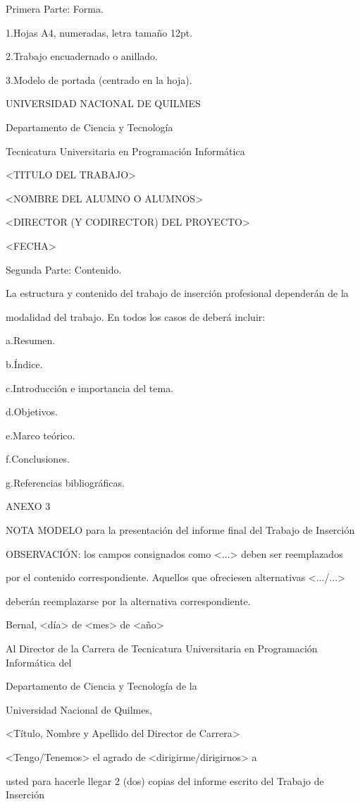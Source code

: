 \documentclass[a4paper,12pt]{article}
\begin{document}
Primera Parte: Forma.

1.Hojas A4, numeradas, letra tamaño 12pt.

2.Trabajo encuadernado o anillado.

3.Modelo de portada (centrado en la hoja).

UNIVERSIDAD NACIONAL DE QUILMES

Departamento de Ciencia y Tecnología

Tecnicatura Universitaria en Programación Informática

<TITULO DEL TRABAJO>

<NOMBRE DEL ALUMNO O ALUMNOS>

<DIRECTOR (Y CODIRECTOR) DEL PROYECTO>

<FECHA>

Segunda Parte: Contenido.

La estructura y contenido del trabajo de inserción profesional dependerán de la

modalidad del trabajo. En todos los casos de deberá incluir:

a.Resumen.

b.Índice.

c.Introducción e importancia del tema.

d.Objetivos.

e.Marco teórico.

f.Conclusiones.

g.Referencias bibliográficas.

ANEXO 3

NOTA MODELO para la presentación del informe final del Trabajo de Inserción

OBSERVACIÓN: los campos consignados como <...> deben ser reemplazados

por el contenido correspondiente. Aquellos que ofreciesen alternativas <.../...>

deberán reemplazarse por la alternativa correspondiente.

Bernal, <día> de <mes> de <año>

Al Director de la Carrera de Tecnicatura Universitaria en Programación Informática del

Departamento de Ciencia y Tecnología de la

Universidad Nacional de Quilmes,

<Título, Nombre y Apellido del Director de Carrera>

<Tengo/Tenemos> el agrado de <dirigirme/dirigirnos> a

usted para hacerle llegar 2 (dos) copias del informe escrito del Trabajo de Inserción
\end{document}
